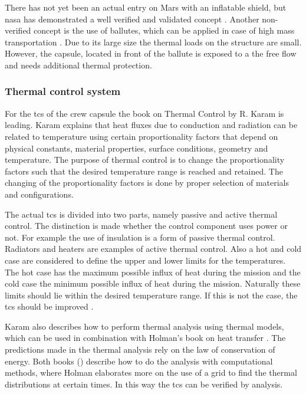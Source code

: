 There has not yet been an actual entry on Mars with an inflatable shield, but \gls{nasa} has demonstrated a well verified and validated concept \cite{Dillman2010, Dillman2012}. Another non-verified concept is the use of ballutes, which can be applied in case of high mass transportation \cite{Hall2001}. Due to its large size the thermal loads on the structure are small. However, the capsule, located in front of the ballute is exposed to a the free flow and needs additional thermal protection.

\subsubsection{Thermal control system}
For the \gls{tcs} of the crew capsule the book on Thermal Control by R. Karam is leading\cite{Karam1998}. Karam explains that heat fluxes due to conduction and radiation can be related to temperature using certain proportionality factors that depend on physical constants, material properties, surface conditions, geometry and temperature. The purpose of thermal control is to change the proportionality factors such that the desired temperature range is reached and retained. The changing of the proportionality factors is done by proper selection of materials and configurations.

The actual \gls{tcs} is divided into two parts, namely passive and active thermal control. The distinction is made whether the control component uses power or not. For example the use of insulation is a form of passive thermal control. Radiators and heaters are examples of active thermal control. Also a hot and cold case are considered to define the upper and lower limits for the temperatures. The hot case has the maximum possible influx of heat during the mission and the cold case the minimum possible influx of heat during the mission. Naturally these limits should lie within the desired temperature range. If this is not the case, the \gls{tcs} should be improved \cite{Karam1998}.

Karam also describes how to perform thermal analysis using thermal models, which can be used in combination with Holman's book on heat transfer \cite{Holman2002}. The predictions made in the thermal analysis rely on the law of conservation of energy. Both books (\cite{Karam1998,Holman2002}) describe how to do the analysis with computational methods, where Holman elaborates more on the use of a grid to find the thermal distributions at certain times. In this way the \gls{tcs} can be verified by analysis.




